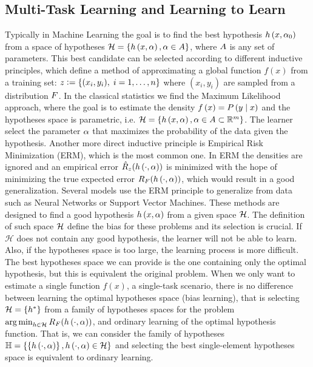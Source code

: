 \subsection{Multi-Task Learning and Learning to Learn} %
Typically in Machine Learning the goal is to find the best hypothesis $h\left(x, \alpha_0\right)$ from a space of hypotheses $\mathcal{H} = \left\{h\left(x, \alpha\right), \alpha \in A\right\}$, where $A$ is any set of parameters. This best candidate can be selected according to different inductive principles, which define a method of approximating a global function $f(x)$ from a training set:
$ z \vcentcolon= \left\{(x_i, y_i),\; i=1, \ldots, n\right\} $
where $(x_i, y_i)$ are sampled from a distribution $F$.
%
In the classical statistics we find the Maximum Likelihood approach, where the goal is to estimate the density $f\left(x\right) = P\left( y \;\middle\vert\; x \right)$ and the hypotheses space is parametric, i.e. $\mathcal{H} = \left\{h\left(x, \alpha\right), \alpha \in A \subset \mathbb{R}^m\right\}$. The learner select the parameter $\alpha$ that maximizes the probability of the data given the hypothesis.
%
Another more direct inductive principle is Empirical Risk Minimization (ERM), which is the most common one. In ERM the densities are ignored and an empirical error $\hat{R}_z(h\left(\cdot, \alpha\right))$ is minimized with the hope of minimizing the true expected error $R_F(h\left(\cdot, \alpha\right))$, which would result in a good generalization. 
%
Several models use the ERM principle to generalize from data such as Neural Networks or Support Vector Machines. These methods are designed to find a good hypothesis $h\left(x, \alpha\right)$ from a given space $\mathcal{H}$. The definition of such space $\mathcal{H}$ define the bias for these problems and its selection is crucial. If $\mathcal{H}$ does not contain any good hypothesis, the learner will not be able to learn.
Also, if the hypotheses space is too large, the learning process is more difficult.
The best hypotheses space we can provide is the one containing only the optimal hypothesis, but this is equivalent the original problem. When we only want to estimate a single function $f(x)$, a single-task scenario, there is no difference between learning the optimal hypotheses space (bias learning), that is selecting $\mathcal{H} = \left\{h^*\right\}$ from a family of hypotheses spaces for the problem $\operatorname*{arg\min}_{h \in \mathcal{H}} R_F(h\left(\cdot, \alpha\right))$, and ordinary learning of the optimal hypothesis function. That is, we can consider the family of hypotheses $\mathbb{H} = \left\{\left\{h\left(\cdot, \alpha\right)\right\}, h\left(\cdot, \alpha\right) \in \mathcal{H}\right\} $ and selecting the best single-element hypotheses space is equivalent to ordinary learning.
